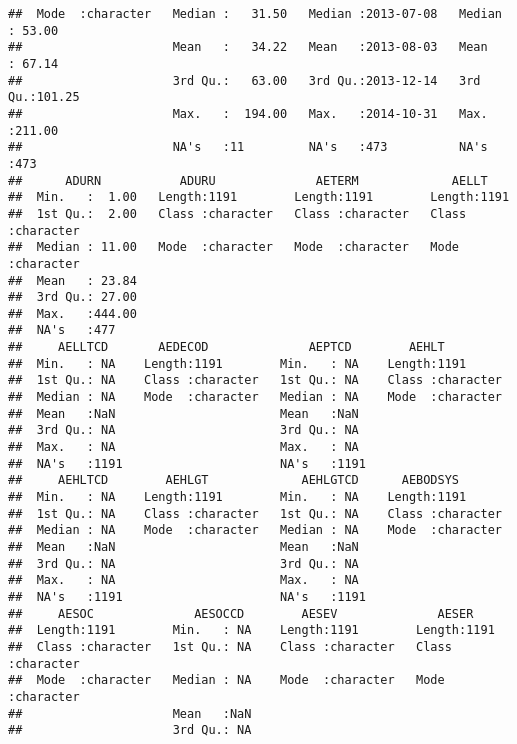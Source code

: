 \documentclass[]{book}
\begin{document}
\begin{verbatim}
##  Mode  :character   Median :   31.50   Median :2013-07-08   Median : 53.00  
##                     Mean   :   34.22   Mean   :2013-08-03   Mean   : 67.14  
##                     3rd Qu.:   63.00   3rd Qu.:2013-12-14   3rd Qu.:101.25  
##                     Max.   :  194.00   Max.   :2014-10-31   Max.   :211.00  
##                     NA's   :11         NA's   :473          NA's   :473     
##      ADURN           ADURU              AETERM             AELLT          
##  Min.   :  1.00   Length:1191        Length:1191        Length:1191       
##  1st Qu.:  2.00   Class :character   Class :character   Class :character  
##  Median : 11.00   Mode  :character   Mode  :character   Mode  :character  
##  Mean   : 23.84                                                           
##  3rd Qu.: 27.00                                                           
##  Max.   :444.00                                                           
##  NA's   :477                                                              
##     AELLTCD       AEDECOD              AEPTCD        AEHLT          
##  Min.   : NA    Length:1191        Min.   : NA    Length:1191       
##  1st Qu.: NA    Class :character   1st Qu.: NA    Class :character  
##  Median : NA    Mode  :character   Median : NA    Mode  :character  
##  Mean   :NaN                       Mean   :NaN                      
##  3rd Qu.: NA                       3rd Qu.: NA                      
##  Max.   : NA                       Max.   : NA                      
##  NA's   :1191                      NA's   :1191                     
##     AEHLTCD        AEHLGT             AEHLGTCD      AEBODSYS        
##  Min.   : NA    Length:1191        Min.   : NA    Length:1191       
##  1st Qu.: NA    Class :character   1st Qu.: NA    Class :character  
##  Median : NA    Mode  :character   Median : NA    Mode  :character  
##  Mean   :NaN                       Mean   :NaN                      
##  3rd Qu.: NA                       3rd Qu.: NA                      
##  Max.   : NA                       Max.   : NA                      
##  NA's   :1191                      NA's   :1191                     
##     AESOC              AESOCCD        AESEV              AESER          
##  Length:1191        Min.   : NA    Length:1191        Length:1191       
##  Class :character   1st Qu.: NA    Class :character   Class :character  
##  Mode  :character   Median : NA    Mode  :character   Mode  :character  
##                     Mean   :NaN                                         
##                     3rd Qu.: NA                                         

\end{verbatim}
\end{document}
